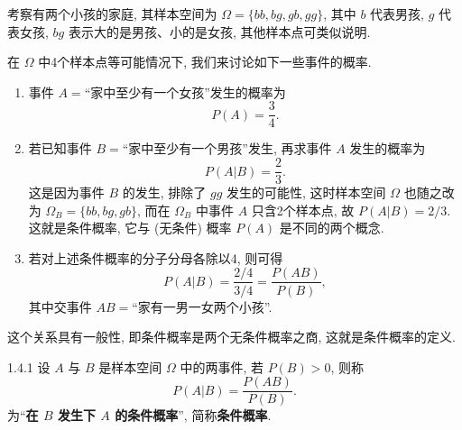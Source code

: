 \begin{example}
  考察有两个小孩的家庭,
  其样本空间为 $\Omega = \{bb,bg,gb,gg\}$,
  其中 $b$ 代表男孩,
  $g$ 代表女孩,
  $bg$ 表示大的是男孩、小的是女孩,
  其他样本点可类似说明.

  在 $\Omega$ 中4个样本点等可能情况下,
  我们来讨论如下一些事件的概率.
  \begin{enumerate}
    \item 事件 $A=$“家中至少有一个女孩”发生的概率为
    \[
      P(A) = \frac{3}{4}.
    \]

    \item 若已知事件 $B=$“家中至少有一个男孩”发生,
    再求事件 $A$ 发生的概率为
    \[
      P(A|B) = \frac{2}{3}.
    \]
    这是因为事件 $B$ 的发生,
    排除了 $gg$ 发生的可能性,
    这时样本空间 $\Omega$ 也随之改为 $\Omega_B = \{bb,bg,gb\}$,
    而在 $\Omega_B$ 中事件 $A$ 只含2个样本点,
    故 $P(A|B) = 2/3$.
    这就是条件概率,
    它与 (无条件) 概率 $P (A)$ 是不同的两个概念.

    \item 若对上述条件概率的分子分母各除以4,
    则可得
    \[
      P(A|B) = \frac{2/4}{3/4} = \frac{P(AB)}{P(B)},
    \]
    其中交事件 $AB=$“家有一男一女两个小孩”.
  \end{enumerate}
\end{example}

这个关系具有一般性,
即条件概率是两个无条件概率之商,
这就是条件概率的定义.

\begin{definition}{}{1.4.1}
  设 $A$ 与 $B$ 是样本空间 $\Omega$ 中的两事件,
  若 $P(B) > 0$,
  则称
  \begin{equation}
    P(A|B) = \frac{P(AB)}{P(B)}.
    \label{eq1.4.1}
  \end{equation}
  为“\textbf{在 $B$ 发生下 $A$ 的条件概率}”,
  简称\textbf{条件概率}.
\end{definition}

